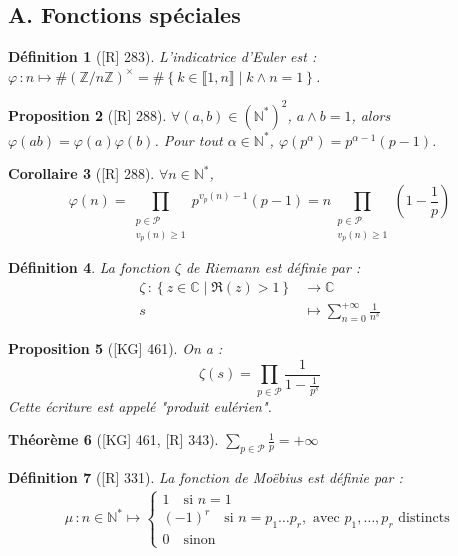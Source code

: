 \documentclass[10pt, a4paper, parskip=full, twoside, twocolumn]{report}
\newtheorem{definition}{Définition}
\newtheorem{theorem}[definition]{Théorème}
\newtheorem{proposition}[definition]{Proposition}
\newtheorem{corollary}[definition]{Corollaire}
\newcommand{\IN}{\mathbb{N}}
\newcommand{\IZnZ}{\mathbb{Z}/n\mathbb{Z}}
\newcommand{\IC}{\mathbb{C}}
\begin{document}
\subsection*{A. Fonctions spéciales}

\begin{definition}[\textnormal{[R] 283}]
	\emph{L'indicatrice d'Euler} est :
	$\varphi\,\colon n \mapsto \#\left(\IZnZ\right)^{\times} = \#\left\{k\in\llbracket 1,n\rrbracket \mid k\wedge n = 1\right\}$.
\end{definition}

\begin{proposition}[\textnormal{[R] 288}]
	$\forall(a,b)\in\left(\IN^*\right)^2$, $a\wedge b=1$, alors $\varphi(ab)=\varphi(a)\varphi(b)$.
	Pour tout $\alpha \in \IN^*$, $\varphi(p^{\alpha}) = p^{\alpha - 1}(p-1)$.
\end{proposition}

\begin{corollary}[\textnormal{[R] 288}]
	$\forall n\in\IN^*$,
	$$\varphi(n) = \prod_{\substack{p\in\mathcal{P}\\v_p(n)\geq 1}} p^{v_p(n)-1}(p-1) = n\prod_{\substack{p\in\mathcal{P}\\v_p(n)\geq 1}} \left(1 - \frac{1}{p}\right)$$	
\end{corollary}

\begin{definition}
	La \emph{fonction $\zeta$ de Riemann} est définie par :
	\begin{align*}
		\zeta\,\colon \left\{z\in\IC\mid \Re(z)> 1\right\} &\to \IC \\
		s &\mapsto \sum_{n=0}^{+\infty} \frac{1}{n^s}
	\end{align*}
\end{definition}

\begin{proposition}[\textnormal{[KG] 461}]
	On a :
	$$\zeta(s) = \prod_{p\in\mathcal{P}}\frac{1}{1 - \frac{1}{p^s}}$$
	Cette écriture est appelé \emph{"produit eulérien"}.
\end{proposition}

\begin{theorem}[\textnormal{[KG] 461, [R] 343}]
	$\sum_{p\in\mathcal{P}}\frac{1}{p} = +\infty$
\end{theorem}

\begin{definition}[\textnormal{[R] 331}]
	La \emph{fonction de Moëbius} est définie par :
	\begin{align*}
		\mu\,\colon n\in\IN^* \mapsto \begin{cases}
			1\quad \text{si } n =1 \\
			(-1)^r\quad \text{si } n=p_1\dots p_r,\text{ avec $p_1,\dots,p_r$ distincts} \\
			0\quad\text{sinon}
		\end{cases}
	\end{align*}
\end{definition}
\end{document}
